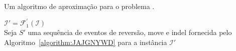 \begin{algorithm}[!tbh]
  \caption{Um algoritmo de aproximação para o problema \SbFIRI{}.\label{algorithm:MODRXVSQ}}
  $\mathcal{I}' = \mathcal{F}_{1}^{'}(\mathcal{I})$ \\
  Seja $S'$ uma sequência de eventos de reversão, move e indel fornecida pelo Algoritmo~\ref{algorithm:JAJGNYWD} para a instância $\mathcal{I}'$ \\
\end{algorithm}